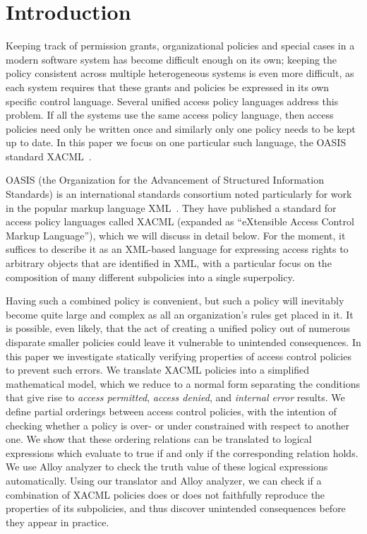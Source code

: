 \section{Introduction}

Keeping track of permission grants, organizational policies and
special cases in a modern software system has become difficult enough
on its own; keeping the policy consistent across multiple
heterogeneous systems is even more difficult, as each system requires
that these grants and policies be expressed in its own specific
control language.  Several unified access policy languages address
this problem.  If all the systems use the same access policy language,
then access policies need only be written once and similarly only one
policy needs to be kept up to date.  In this paper we focus on one
particular such language, the OASIS standard XACML~\cite{xacml}.

OASIS (the Organization for the Advancement of Structured Information
Standards) is an international standards consortium noted particularly
for work in the popular markup language XML~\cite{XML}.  They have
published a standard for access policy languages called XACML
(expanded as ``eXtensible Access Control Markup Language''), which we
will discuss in detail below.  For the moment, it suffices to describe
it as an XML-based language for expressing access rights to arbitrary
objects that are identified in XML, with a particular focus on the
composition of many different subpolicies into a single superpolicy.

Having such a combined policy is convenient, but such a policy will
inevitably become quite large and complex as all an organization's
rules get placed in it.  It is possible, even likely, that the act of
creating a unified policy out of numerous disparate smaller policies
could leave it vulnerable to unintended consequences.  In this paper
we investigate statically verifying properties of access control
policies to prevent such errors. We translate XACML policies into a
simplified mathematical model, which we reduce to a normal form
separating the conditions that give rise to {\em access permitted},
{\em access denied}, and {\em internal error} results. We define
partial orderings between access control policies, with the intention
of checking whether a policy is over- or under constrained with
respect to another one.  We show that these ordering relations can be
translated to logical expressions which evaluate to true if and only
if the corresponding relation holds.  We use Alloy analyzer to check
the truth value of these logical expressions automatically. Using our
translator and Alloy analyzer, we can check if a combination of XACML
policies does or does not faithfully reproduce the properties of its
subpolicies, and thus discover unintended consequences before they
appear in practice.

